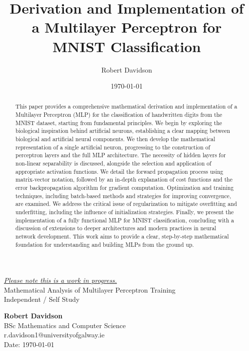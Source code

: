 \documentclass[9pt]{extarticle}
\title{Derivation and Implementation of a Multilayer Perceptron for MNIST Classification}
\author{Robert Davidson}
\date{\today}
\begin{document}
\begin{center}
    \underline{\emph{Please note this is a work in progress.}} \\
    \vspace{0.5cm}
    Mathematical Analysis of Multilayer Perceptron Training\\
    Independent / Self Study\\[24pt]
    \LARGE

    \Large
    \textbf{Robert Davidson}\\[6pt]
    \small
    BSc Mathematics and Computer Science \\ r.davidson1@universityofgalway.ie\\[6pt]
    Date: \today\\[12pt]
\end{center}
\begin{abstract}
    \begin{adjustwidth}{1cm}{1cm}
        This paper provides a comprehensive mathematical derivation and implementation of a Multilayer Perceptron (MLP)
        for the classification of handwritten digits from the MNIST dataset, starting from fundamental principles.
        We begin by exploring the biological inspiration behind artificial neurons, establishing a clear mapping between biological and artificial neural components.
        We then develop the mathematical representation of a single artificial neuron, progressing to the construction of perceptron layers and the full MLP architecture.
        The necessity of hidden layers for non-linear separability is discussed, alongside the selection and application of appropriate activation functions.
        We detail the forward propagation process using matrix-vector notation, followed by an in-depth explanation of cost functions and the error backpropagation algorithm
        for gradient computation. Optimization and training techniques, including batch-based methods and strategies for improving convergence, are examined.
        We address the critical issue of regularization to mitigate overfitting and underfitting, including the influence of initialization strategies.
        Finally, we present the implementation of a fully functional MLP for MNIST classification, concluding with a discussion of extensions to deeper architectures
        and modern practices in neural network development. This work aims to provide a clear, step-by-step mathematical foundation for understanding and building MLPs from the ground up.
    \end{adjustwidth}
\end{abstract}
\end{document}
